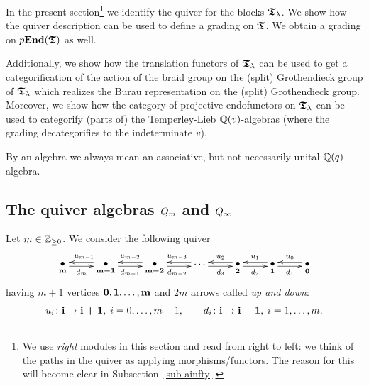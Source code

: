 In the present section\footnote{We use \textit{right} modules in this 
section and read from right to left: we think of the paths 
in the quiver as applying morphisms/functors. The reason for this 
will become clear in Subsection~\ref{sub-ainfty}.} we identify 
the quiver for the blocks $\boldsymbol{\mathfrak{T}}_{\lambda}$. We show how the 
quiver description can be used to define a grading on $\boldsymbol{\mathfrak{T}}$. We 
obtain a grading on $p\boldsymbol{\mathrm{End}}(\boldsymbol{\mathfrak{T}})$ as well.



Additionally, we show how the translation functors of $\boldsymbol{\mathfrak{T}}_{\lambda}$ 
can be used to get a categorification of the action of the 
braid group on the (split) Grothendieck group of $\boldsymbol{\mathfrak{T}}_{\lambda}$ which realizes the 
Burau representation on the (split) Grothendieck group. Moreover, we show how 
the category of projective endofunctors on $\boldsymbol{\mathfrak{T}}_{\lambda}$ can be used to 
categorify 
(parts of) the Temperley-Lieb $\mathbb{Q}(v)$-algebras (where the grading decategorifies to the 
indeterminate $v$).


By an algebra we always mean an associative, but not necessarily unital $\mathbb{Q}(q)$-algebra.


\subsection{The quiver algebras \texorpdfstring{$Q_{m}$}{Qm} and \texorpdfstring{$Q_{\infty}$}{Ain}}\label{sub-qalg}
Let $m\in\mathbb{Z}_{\geq 0}$. We consider the following quiver
\begin{equation}\label{eq-quiver}
\xymatrix{
  \raisebox{0.1cm}{\xy(0,0)*{\bullet};(0,-2.5)*{\scriptstyle \bbm};\endxy}  \ar@<-2pt>[r]_/-0.25em/{d_{m}}  &  \raisebox{0.1cm}{\xy(0,0)*{\bullet};(0,-2.5)*{\scriptstyle \bbmd};\endxy}  \ar@<-2pt>[l]_{u_{m-1}}\ar@<-2pt>[r]_{d_{m-1}} & 
\raisebox{0.1cm}{\xy(0,0)*{\bullet};(0,-2.5)*{\scriptstyle \bbmdd};\endxy}  \ar@<-2pt>[l]_{u_{m-2}}\ar@<-2pt>[r]_{d_{m-2}} &  
  \cdots \ar@<-2pt>[l]_{u_{m-3}}\ar@<-2pt>[r]_/+0.2em/{d_{3}} & \raisebox{0.1cm}{\xy(0,0)*{\bullet};(0,-2.5)*{\scriptstyle \bbt};\endxy}  \ar@<-2pt>[l]_/-0.2em/{u_{2}}\ar@<-2pt>[r]_{d_{2}} & \raisebox{0.1cm}{\xy(0,0)*{\bullet};(0,-2.5)*{\scriptstyle \bbo};\endxy}  \ar@<-2pt>[l]_{u_{1}}\ar@<-2pt>[r]_{d_{1}} & \raisebox{0.1cm}{\xy(0,0)*{\bullet};(0,-2.5)*{\scriptstyle \bbz};\endxy}  \ar@<-2pt>[l]_{u_0}\\
}
\end{equation}
having $m+1$ vertices $\boldsymbol{0},\boldsymbol{1},\dots,\boldsymbol{\mathrm{m}}$ and $2m$ arrows called \textit{up and down}:
\[
u_i\colon \boldsymbol{\mathrm{i}}\to \boldsymbol{\mathrm{i}+1},\;i=0,\dots,m-1,\quad\quad d_i\colon \boldsymbol{\mathrm{i}}\to \boldsymbol{\mathrm{i}-1},\;i=1,\dots,m.
\]



